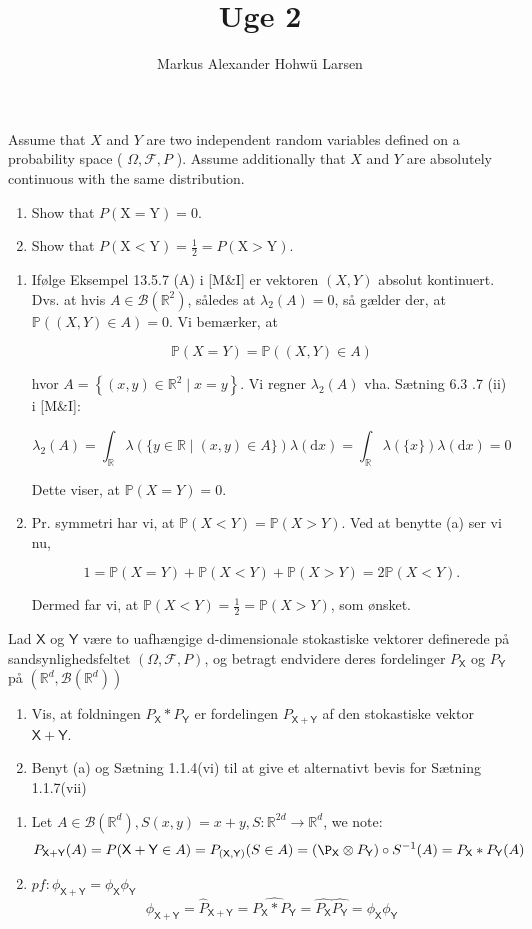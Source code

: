 \documentclass{Class}
\title{Uge 2}
\author{Markus Alexander Hohwü Larsen}
\newcommand{\R}{\mathbb{R}}
\newcommand{\1}{\mathbbm{1}}
\newcommand{\X}{\mathsf{X}}
\newcommand{\Y}{\mathsf{Y}}
\newcommand{\B}{\mathcal{B}}
\newcommand{\pfield}{(\Omega, \mathcal{F}, P)}
\theoremstyle{boxed}
\begin{document}
Assume that $X$ and $Y$ are two independent random variables defined on a probability space ( $\Omega, \mathcal{F}, P$ ). Assume additionally that $X$ and $Y$ are absolutely continuous with the same distribution.
\begin{enumerate}
  \item  Show that $P(\mathrm{X}=\mathrm{Y})=0$.
  \item Show that $P(\mathrm{X}<\mathrm{Y})=\frac{1}{2}=P(\mathrm{X}>\mathrm{Y})$.
  \end{enumerate}
\solution
\begin{enumerate}
  \item Ifølge Eksempel 13.5.7 (A) i [M\&I] er vektoren $(X, Y)$ absolut kontinuert. Dvs. at hvis $A \in \mathcal{B}\left(\mathbb{R}^2\right)$, således at $\lambda_2(A)=0$, så gælder der, at $\mathbb{P}((X, Y) \in A)=0$. Vi bemærker, at

  $$
  \mathbb{P}(X=Y)=\mathbb{P}((X, Y) \in A)
  $$
  
  hvor $A=\left\{(x, y) \in \mathbb{R}^2 \mid x=y\right\}$. Vi regner $\lambda_2(A)$ vha. Sætning 6.3 .7 (ii) i [M\&I]:
  
  $$
  \lambda_2(A)=\int_{\mathbb{R}} \lambda(\{y \in \mathbb{R} \mid(x, y) \in A\}) \lambda(\mathrm{d} x)=\int_{\mathbb{R}} \lambda(\{x\}) \lambda(\mathrm{d} x)=0
  $$
  
  
  Dette viser, at $\mathbb{P}(X=Y)=0$.

  \item Pr. symmetri har vi, at $\mathbb{P}(X<Y)=\mathbb{P}(X>Y)$. Ved at benytte (a) ser vi nu,

  $$
  1=\mathbb{P}(X=Y)+\mathbb{P}(X<Y)+\mathbb{P}(X>Y)=2 \mathbb{P}(X<Y) .
  $$
  
  
  Dermed far vi, at $\mathbb{P}(X<Y)=\frac{1}{2}=\mathbb{P}(X>Y)$, som ønsket.
\end{enumerate}



Lad $\X$ og $\Y$ være to uafhængige d-dimensionale stokastiske vektorer definerede på sandsynlighedsfeltet $\pfield$, og betragt endvidere deres fordelinger $P_\X$ og $P_\Y$ på $(\R^d, \B(\R^d))$
\begin{enumerate}
  \item Vis, at foldningen $P_\X * P_\Y$ er fordelingen $P_{\X+\Y}$ af den stokastiske vektor $\X+\Y$.
  \item Benyt (a) og Sætning 1.1.4(vi) til at give et alternativt bevis for Sætning 1.1.7(vii)
\end{enumerate}
\solution
\begin{enumerate}
\item Let $A\in\B(\R^d), S(x,y)=x+y, S:\R^{2d}\rightarrow \R^d$, we note:
$$P_{\X+\Y}(A)=P(\X+\Y\in A)=P_{(\X,\Y)}(S\in A)=(\P_\X \otimes P_\Y)\circ S^{-1}(A)=P_\X*P_\Y(A)$$ 
\item $pf:\phi_{\X+\Y}=\phi_{\X}\phi_\Y$
$$\phi_{\X+\Y}=\hat{P}_{\X+\Y}=\hat{P_{\X}*P_{\Y}}=\hat{P_\X}\hat{P_\Y}=\phi_\X\phi_\Y$$
\end{enumerate}
\end{document}
